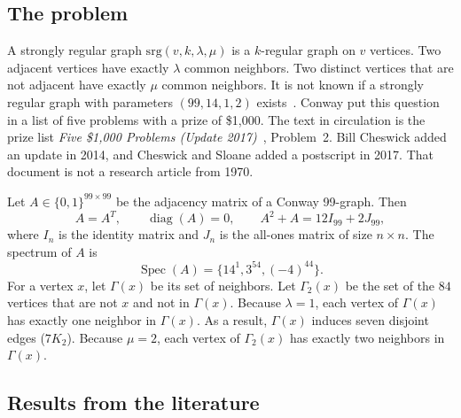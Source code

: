 \documentclass[pdflatex,sn-mathphys-num]{sn-jnl}
\theoremstyle{thmstyleone}
\theoremstyle{thmstyletwo}
\theoremstyle{thmstylethree}
\DeclareMathOperator{\Spec}{Spec}
\numberwithin{equation}{section}
\begin{document}
\subsection{The problem}

A strongly regular graph $\mathrm{srg}(v, k, \lambda, \mu)$ is a $k$-regular graph on $v$ vertices.
Two adjacent vertices have exactly $\lambda$ common neighbors.
Two distinct vertices that are not adjacent have exactly $\mu$ common neighbors.
It is not known if a strongly regular graph with parameters $(99, 14, 1, 2)$ exists~\cite{brouwer2011spectra,cesarz2025automorphisms}.
Conway put this question in a list of five problems with a prize of \$1{,}000.
The text in circulation is the prize list \emph{Five \$1,000 Problems (Update 2017)}~\cite{conway1970}, Problem~2.
Bill Cheswick added an update in 2014, and Cheswick and Sloane added a postscript in 2017.
That document is not a research article from 1970.

Let $A \in \{0,1\}^{99 \times 99}$ be the adjacency matrix of a Conway 99-graph. Then
\begin{equation}
 A = A^T, \qquad \operatorname{diag}(A) = 0, \qquad A^2 + A = 12I_{99} + 2J_{99},
 \label{eq:matrix}
\end{equation}
where $I_n$ is the identity matrix and $J_n$ is the all-ones matrix of size $n \times n$.
The spectrum of $A$ is
\begin{equation}
 \Spec(A) = \{14^1, 3^{54}, (-4)^{44}\}.
 \label{eq:spectrum}
\end{equation}
For a vertex $x$, let $\Gamma(x)$ be its set of neighbors. Let $\Gamma_2(x)$ be the set of the $84$ vertices that are not $x$ and not in $\Gamma(x)$.
Because $\lambda = 1$, each vertex of $\Gamma(x)$ has exactly one neighbor in $\Gamma(x)$.
As a result, $\Gamma(x)$ induces seven disjoint edges ($7K_2$).
Because $\mu = 2$, each vertex of $\Gamma_2(x)$ has exactly two neighbors in $\Gamma(x)$.

\subsection{Results from the literature}
\end{document}

